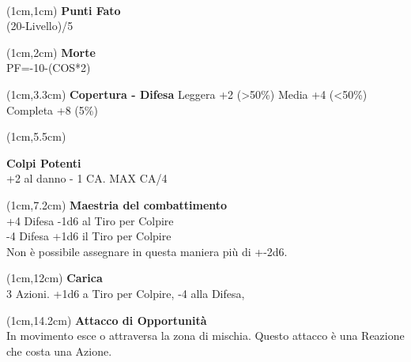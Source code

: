 \documentclass[a4paper,12 pt,openany]{book}
\begin{document}
	~\newpage

	\begin{textblock*}{4cm}(1cm,1cm) %
		{\textbf{Punti Fato}\\
			\footnotesize
			(20-Livello)/5}
	\end{textblock*}

	\begin{textblock*}{4cm}(1cm,2cm) %
		{\textbf{Morte}\\
			\footnotesize
			PF=-10-(COS*2)}
	\end{textblock*}

\begin{textblock*}{4cm}(1cm,3.3cm) %
\textbf{Copertura - Difesa}
Leggera +2 (>50\%)
Media +4 (<50\%)
Completa +8 (5\%)
	\end{textblock*}

\begin{textblock*}{4cm}(1cm,5.5cm) %

\textbf{Colpi Potenti}\\
+2 al danno - 1 CA. MAX CA/4

	\end{textblock*}

\begin{textblock*}{4cm}(1cm,7.2cm) %
\textbf{Maestria del combattimento}\\
+4 Difesa -1d6 al Tiro per Colpire\\
-4 Difesa +1d6 il Tiro per Colpire \\
Non è possibile assegnare in questa maniera più di +-2d6.
	\end{textblock*}


\begin{textblock*}{4cm}(1cm,12cm) %
\textbf{Carica}\\
3 Azioni. +1d6 a Tiro per Colpire, -4 alla Difesa,
\end{textblock*}


\begin{textblock*}{4cm}(1cm,14.2cm) %
	\textbf{Attacco di Opportunità}\\
In movimento esce o attraversa la zona di mischia.
Questo attacco è una Reazione che costa una Azione.
\end{textblock*}
\end{document}
